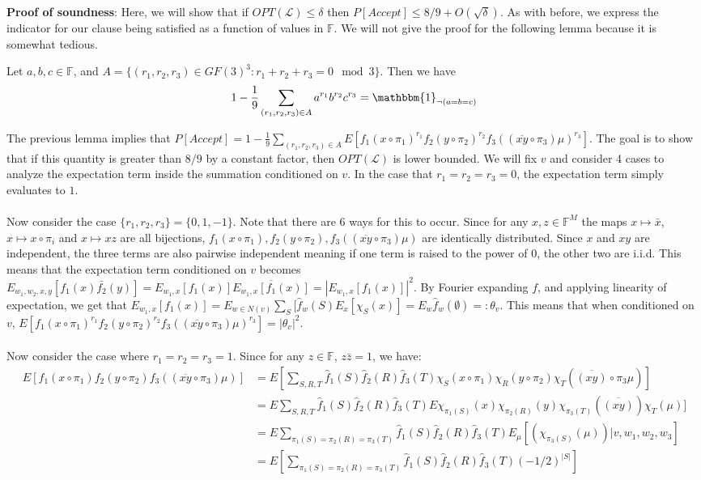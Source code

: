 \documentclass{article}
\newcommand{\1}{\mathbbm{1}}
\newcommand{\F}{\mathbb{F}}
\begin{document}
\textbf{Proof of soundness}: Here, we will show that if $OPT(\mathcal{L})\leq \delta$ then $P[Accept]\leq 8/9+O(\sqrt{\delta})$. As with before, we express the indicator for our clause being satisfied as a function of values in $\F$. We will not give the proof for the following lemma because it is somewhat tedious.
\begin{lemma}
Let $a,b,c\in \F$, and $A = \{(r_1, r_2, r_3)\in GF(3)^3: r_1 + r_2+r_3 = 0\mod 3\}$. Then we have $$1-\frac{1}{9}\sum_{(r_1,r_2,r_3)\in A}a^{r_1}b^{r_2}c^{r_3} = \1_{\neg(a=b=c)}$$
\end{lemma}
The previous lemma implies that $P[Accept] = 1-\frac{1}{9}\sum_{(r_1,r_2,r_3)\in A}E[f_1(x\circ \pi_1)^{r_1}f_2(y\circ\pi_2)^{r_2}f_3((\overline{xy}\circ \pi_3)\mu)^{r_3}]$. The goal is to show that if this quantity is greater than $8/9$ by a constant factor, then $OPT(\mathcal{L})$ is lower bounded. We will fix $v$ and consider 4 cases to analyze the expectation term inside the summation conditioned on $v$. In the case that $r_1 = r_2 = r_3 = 0$, the expectation term simply evaluates to $1$. \\\\
Now consider the case $\{r_1, r_2, r_3\} = \{0,1,-1\}$. Note that there are 6 ways for this to occur. Since for any $x,z\in \F^M$ the maps $x\mapsto \bar{x}$, $x\mapsto x\circ\pi_i$ and $x\mapsto xz$ are all bijections, $f_1(x\circ \pi_1), f_2(y\circ\pi_2), f_3((\overline{xy}\circ \pi_3)\mu)$ are identically distributed. Since $x$ and $xy$ are independent, the three terms are also pairwise independent meaning if one term is raised to the power of $0$, the other two are i.i.d. This means that the expectation term conditioned on $v$ becomes $E_{w_1, w_2,x,y}[f_1(x)\bar{f_2}(y)] = E_{w_1,x}[f_1(x)]\overline{E_{w_1,x}[f_1(x)]} = |E_{w_1,x}[f_1(x)]|^2$. By Fourier expanding $f$, and applying linearity of expectation, we get that $E_{w_1,x}[f_1(x)] = E_{w\in N(v)}\sum_{S}[\hat{f}_w(S)E_{x}[\chi_S(x)] = E_w\hat{f}_w(\emptyset) =: \theta_v$. This means that when conditioned on $v$, $E[f_1(x\circ \pi_1)^{r_1}f_2(y\circ\pi_2)^{r_2}f_3((\overline{xy}\circ \pi_3)\mu)^{r_3}] = |\theta_v|^2$.\\\\
Now consider the case where $r_1=r_2=r_3=1$. Since for any $z\in \F$, $z\bar{z} = 1$, we have:
\begin{align*}
    E[f_1(x\circ \pi_1)f_2(y\circ\pi_2)f_3((\overline{xy}\circ \pi_3)\mu)] &= E[\sum_{S,R,T }\hat{f}_1(S)\hat{f}_2(R)\hat{f}_3(T)\chi_{S}(x\circ \pi_1)\chi_{R}(y\circ\pi_2)\chi_{T}(\overline{(xy)}\circ\pi_3\mu)]\\
    &= E\sum_{S,R,T }\hat{f}_1(S)\hat{f}_2(R)\hat{f}_3(T)E\chi_{\pi_1(S)}(x)\chi_{\pi_2(R)}(y)\chi_{\pi_3(T)}(\overline{(xy)})\chi_T(\mu)]\\
    &=E\sum_{\pi_1(S)=\pi_2(R)=\pi_3(T) }\hat{f}_1(S)\hat{f}_2(R)\hat{f}_3(T)E_{\mu}[(\chi_{\pi_3(S)}(\mu))|v,w_1,w_2,w_3]\\
    &= E[\sum_{\pi_1(S)=\pi_2(R)=\pi_3(T) }\hat{f}_1(S)\hat{f}_2(R)\hat{f}_3(T)(-1/2)^{|S|}]
\end{align*}
\end{document}
